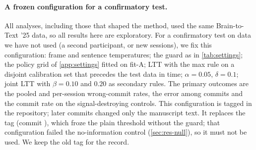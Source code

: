 \paragraph{A frozen configuration for a confirmatory test.} All analyses, including those that shaped the method, used the same Brain-to-Text '25 data, so all results here are exploratory. For a confirmatory test on data we have not used (a second participant, or new sessions), we fix this configuration: frame and sentence temperatures; the guard as in \cref{tab:settings}; the policy grid of \cref{app:settings} fitted on fit-A; LTT with the max rule on a disjoint calibration set that precedes the test data in time; $\alpha = 0.05$, $\delta = 0.1$; joint LTT with $\beta = 0.10$ and $0.20$ as secondary rules. The primary outcomes are the pooled and per-session wrong-commit rates, the error among commits and the commit rate on the signal-destroying controls. This configuration is tagged  in the repository; later commits changed only the manuscript text. It replaces the tag  (commit ), which froze the plain threshold without the guard; that configuration failed the no-information control (\cref{sec:res-null}), so it must not be used. We keep the old tag for the record.
